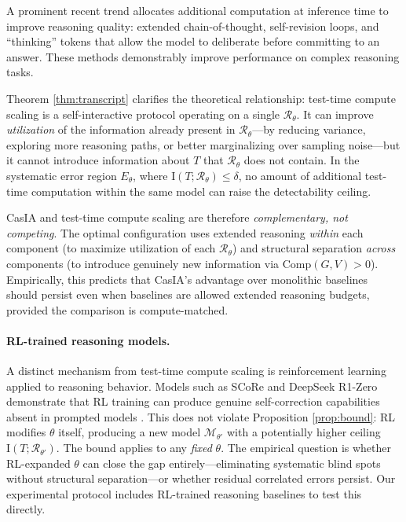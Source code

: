 \documentclass[11pt,a4paper]{article}
\theoremstyle{remark}
\newcommand{\MI}{\mathrm{I}}
\begin{document}
A prominent recent trend allocates additional computation at inference time to improve reasoning quality: extended chain-of-thought, self-revision loops, and ``thinking'' tokens that allow the model to deliberate before committing to an answer. These methods demonstrably improve performance on complex reasoning tasks.

Theorem \ref{thm:transcript} clarifies the theoretical relationship: test-time compute scaling is a self-interactive protocol operating on a single $\mathcal{R}_\theta$. It can improve \emph{utilization} of the information already present in $\mathcal{R}_\theta$---by reducing variance, exploring more reasoning paths, or better marginalizing over sampling noise---but it cannot introduce information about $T$ that $\mathcal{R}_\theta$ does not contain. In the systematic error region $E_\theta$, where $\MI(T; \mathcal{R}_\theta) \leq \delta$, no amount of additional test-time computation within the same model can raise the detectability ceiling.

CasIA and test-time compute scaling are therefore \emph{complementary, not competing}. The optimal configuration uses extended reasoning \emph{within} each component (to maximize utilization of each $\mathcal{R}_\theta$) and structural separation \emph{across} components (to introduce genuinely new information via $\mathrm{Comp}(G, V) > 0$). Empirically, this predicts that CasIA's advantage over monolithic baselines should persist even when baselines are allowed extended reasoning budgets, provided the comparison is compute-matched.

\paragraph{RL-trained reasoning models.} A distinct mechanism from test-time compute scaling is reinforcement learning applied to reasoning behavior. Models such as SCoRe \cite{kumar2025score} and DeepSeek R1-Zero \cite{deepseek2025r1} demonstrate that RL training can produce genuine self-correction capabilities absent in prompted models \cite{huang2024selfcorrection,kamoi2024selfcorrection}. This does not violate Proposition \ref{prop:bound}: RL modifies $\theta$ itself, producing a new model $\mathcal{M}_{\theta'}$ with a potentially higher ceiling $\MI(T; \mathcal{R}_{\theta'})$. The bound applies to any \emph{fixed} $\theta$. The empirical question is whether RL-expanded $\theta$ can close the gap entirely---eliminating systematic blind spots without structural separation---or whether residual correlated errors persist. Our experimental protocol includes RL-trained reasoning baselines to test this directly.
\end{document}
